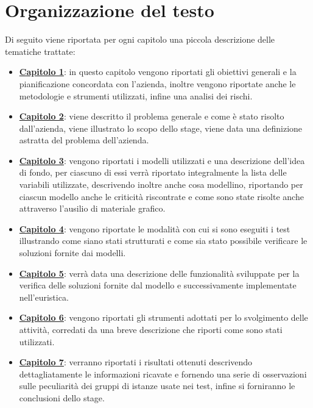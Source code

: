\section{Organizzazione del testo}
Di seguito viene riportata per ogni capitolo una piccola descrizione delle tematiche trattate:
\begin{itemize}
	\item \hyperlink{(chap:processi_metodologie)}{\textbf{Capitolo 1}}: in questo capitolo vengono riportati gli obiettivi generali e la pianificazione concordata con l'azienda, inoltre vengono riportate anche le metodologie e strumenti utilizzati, infine una analisi dei rischi.
	\item \hyperlink{(chap:inquadramento)}{\textbf{Capitolo 2}}: viene descritto il problema generale e come è stato risolto dall'azienda, viene illustrato lo scopo dello stage, viene data una definizione astratta del problema dell'azienda.
	\item \hyperlink{(chap:processi_metodologie)}{\textbf{Capitolo 3}}: vengono riportati i modelli utilizzati e una descrizione dell'idea di fondo, per ciascuno di essi verrà riportato integralmente la lista delle variabili utilizzate, descrivendo inoltre anche cosa modellino, riportando per ciascun modello anche le criticità riscontrate e come sono state risolte anche attraverso l'ausilio di materiale grafico.
	\item \hyperlink{(chap:processi_metodologie)}{\textbf{Capitolo 4}}: vengono riportate le modalità con cui si sono eseguiti i test illustrando come siano stati strutturati e come sia stato possibile verificare le soluzioni fornite dai modelli.
	\item \hyperlink{(chap:processi_metodologie)}{\textbf{Capitolo 5}}: verrà data una descrizione delle funzionalità sviluppate per la verifica delle soluzioni fornite dal modello e successivamente implementate nell'euristica.
	\item \hyperlink{(chap:processi_metodologie)}{\textbf{Capitolo 6}}: vengono riportati gli strumenti adottati per lo svolgimento delle attività, corredati da una breve descrizione che riporti come sono stati utilizzati.
	\item \hyperlink{(chap:processi_metodologie)}{\textbf{Capitolo 7}}: verranno riportati i risultati ottenuti descrivendo dettagliatamente le informazioni ricavate e fornendo una serie di osservazioni sulle peculiarità dei gruppi di istanze usate nei test, infine si forniranno le conclusioni dello stage.
\end{itemize}
